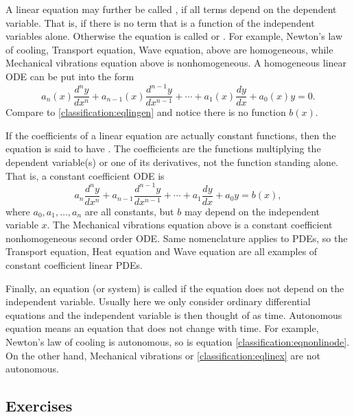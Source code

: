 \medskip

A linear equation may further be called \emph{}, if
all terms depend on the dependent variable.  That is, if there is no
term that is a function of the independent variables alone.  Otherwise the
equation is called \emph{} or
\emph{}.  For example,
Newton's law of cooling, Transport equation, Wave equation, above are homogeneous,
while Mechanical vibrations equation above is nonhomogeneous.
A homogeneous linear ODE can be put into the form
\begin{equation*}
a_n(x) \frac{d^n y}{dx^n} + 
a_{n-1}(x) \frac{d^{n-1} y}{dx^{n-1}} + 
\cdots
+
a_{1}(x) \frac{dy}{dx}
+
a_{0}(x) y = 0 .
\end{equation*}
Compare to \eqref{classification:eqlingen} and notice there is no
function $b(x)$.

\medskip

If the coefficients of a linear equation are actually constant functions,
then the equation is said to have \emph{}.
The coefficients are the functions multiplying the dependent
variable(s) or one of its derivatives, not the function standing alone.
That is, a constant coefficient ODE is
\begin{equation*}
a_n \frac{d^n y}{dx^n} + 
a_{n-1} \frac{d^{n-1} y}{dx^{n-1}} + 
\cdots
+
a_{1} \frac{dy}{dx}
+
a_{0} y = b(x) ,
\end{equation*}
where $a_0, a_1, \ldots, a_n$ are all constants, but $b$ may depend on 
the independent variable $x$.  The Mechanical vibrations equation
above is a constant coefficient nonhomogeneous second order ODE\@.
Same nomenclature applies to PDEs, so the Transport equation,
Heat equation and Wave equation are all examples of constant coefficient
linear PDEs.

\medskip

Finally, an equation (or system) is called \emph{}
if the equation does not depend on the independent variable.
Usually here we only consider ordinary differential equations and the
independent variable is then thought of as time.  Autonomous equation
means an equation that does not change with time.
For example, Newton's law of cooling is autonomous, so is equation
\eqref{classification:eqnonlinode}.  On the other hand, Mechanical
vibrations or 
\eqref{classification:eqlinex} are not autonomous.

\subsection{Exercises}

